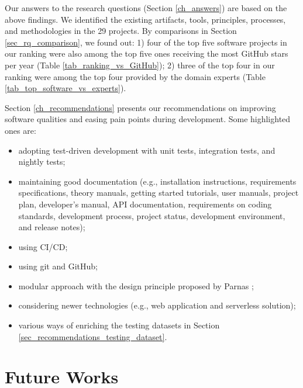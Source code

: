 Our answers to the research questions (Section \ref{ch_answers}) are based on the above findings. We identified the existing artifacts, tools, principles, processes, and methodologies in the 29 projects. By comparisons in Section \ref{sec_rq_comparison}, we found out: 1) four of the top five software projects in our ranking were also among the top five ones receiving the most GitHub stars per year (Table \ref{tab_ranking_vs_GitHub}); 2) three of the top four in our ranking were among the top four provided by the domain experts (Table \ref{tab_top_software_vs_experts}).

Section \ref{ch_recommendations} presents our recommendations on improving software qualities and easing pain points during development. Some highlighted ones are:
\begin{itemize}
\item adopting test-driven development with unit tests, integration tests, and nightly tests;
\item maintaining good documentation (e.g., installation instructions, requirements specifications, theory manuals, getting started tutorials, user manuals, project plan, developer’s manual, API documentation, requirements on coding standards, development process, project status, development environment, and release notes);
\item using CI/CD;
\item using git and GitHub;
\item modular approach with the design principle proposed by Parnas \cite{ParnasEtAl2000};
\item considering newer technologies (e.g., web application and serverless solution);
\item various ways of enriching the testing datasets in Section \ref{sec_recommendations_testing_dataset}.
\end{itemize}

\section{Future Works}

